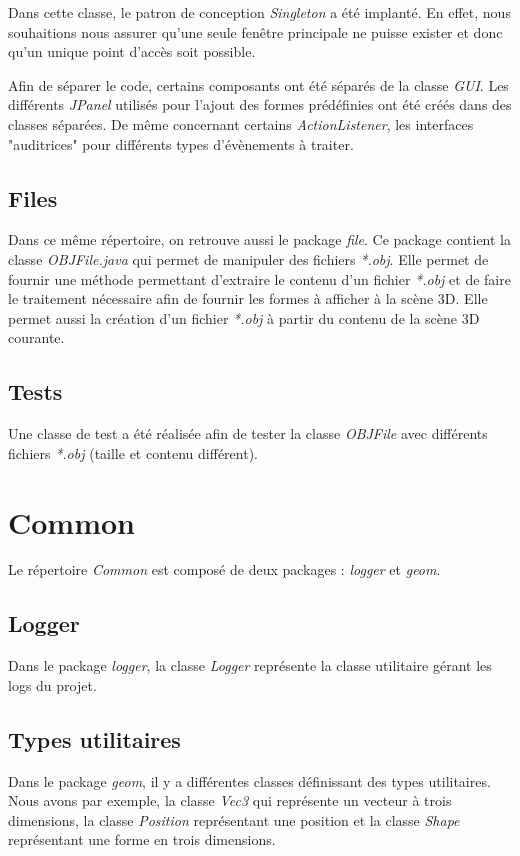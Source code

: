 \documentclass[11pt]{report}
\begin{document}
Dans cette classe, le patron de conception \textit{Singleton} a été implanté. En effet, nous souhaitions nous assurer qu'une seule fenêtre principale ne puisse exister et donc qu'un unique point d'accès soit possible.

Afin de séparer le code, certains composants ont été séparés de la classe \textit{GUI}. Les différents \textit{JPanel} utilisés pour l'ajout des formes prédéfinies ont été créés dans des classes séparées. De même concernant certains \textit{ActionListener}, les interfaces "auditrices" pour différents types d'évènements à traiter.


\subsection{Files}
Dans ce même répertoire, on retrouve aussi le package \textit{file}. Ce package contient la classe \textit{OBJFile.java} qui permet de manipuler des fichiers \textit{*.obj}. Elle permet de fournir une méthode permettant d'extraire le contenu d'un fichier \textit{*.obj} et de faire le traitement nécessaire afin de fournir les formes à afficher à la scène 3D.
Elle permet aussi la création d'un fichier \textit{*.obj} à partir du contenu de la scène 3D courante.

\subsection{Tests}

Une classe de test a été réalisée afin de tester la classe \textit{OBJFile} avec différents fichiers \textit{*.obj} (taille et contenu différent).

\section{Common}
Le répertoire \textit{Common} est composé de deux packages : \textit{logger} et \textit{geom}.

\subsection{Logger}
Dans le package \textit{logger}, la classe \textit{Logger} représente la classe utilitaire gérant les logs du projet.

\subsection{Types utilitaires}
Dans le package \textit{geom}, il y a différentes classes définissant des types utilitaires. Nous avons par exemple, la classe \textit{Vec3} qui représente un vecteur à trois dimensions, la classe \textit{Position} représentant une position et la classe \textit{Shape} représentant une forme en trois dimensions.
\end{document}
